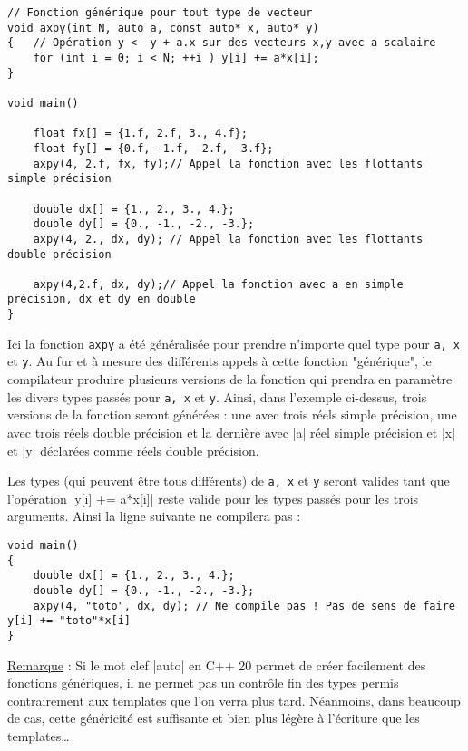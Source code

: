 \begin{lstlisting}[caption=utilisation du mot clef auto pour déclarer les paramètres de la fonction]
// Fonction générique pour tout type de vecteur
void axpy(int N, auto a, const auto* x, auto* y)
{   // Opération y <- y + a.x sur des vecteurs x,y avec a scalaire
    for (int i = 0; i < N; ++i ) y[i] += a*x[i];
}

void main()

    float fx[] = {1.f, 2.f, 3., 4.f};
    float fy[] = {0.f, -1.f, -2.f, -3.f};
    axpy(4, 2.f, fx, fy);// Appel la fonction avec les flottants simple précision

    double dx[] = {1., 2., 3., 4.};
    double dy[] = {0., -1., -2., -3.};
    axpy(4, 2., dx, dy); // Appel la fonction avec les flottants double précision

    axpy(4,2.f, dx, dy);// Appel la fonction avec a en simple précision, dx et dy en double
}
\end{lstlisting}

Ici la fonction \texttt{axpy} a été généralisée pour prendre n'importe quel type pour \texttt{a, x} et \texttt{y}.
Au fur et à mesure des différents appels à cette fonction "générique", le compilateur produire plusieurs versions de la
fonction qui prendra en paramètre les divers types passés pour \texttt{a, x} et \texttt{y}. Ainsi, dans l'exemple ci-dessus,
trois versions de la fonction seront générées : une avec trois réels simple précision, une avec trois réels double précision
et la dernière avec |a| réel simple précision et |x| et |y| déclarées comme réels double précision.

Les types (qui peuvent être tous différents) de \texttt{a, x} et \texttt{y}
seront valides tant que l'opération |y[i] += a*x[i]| reste valide pour les types passés pour les trois arguments. Ainsi
la ligne suivante ne compilera pas :

\begin{lstlisting}
void main()
{
    double dx[] = {1., 2., 3., 4.};
    double dy[] = {0., -1., -2., -3.};
    axpy(4, "toto", dx, dy); // Ne compile pas ! Pas de sens de faire y[i] += "toto"*x[i]  
}
\end{lstlisting}

\underline{Remarque} : Si le mot clef |auto| en C++ 20 permet de créer facilement des fonctions génériques, il ne permet pas
un contrôle fin des types permis contrairement aux templates que l'on verra plus tard. Néanmoins, dans beaucoup de cas, cette
généricité est suffisante et bien plus légère à l'écriture que les templates\ldots

